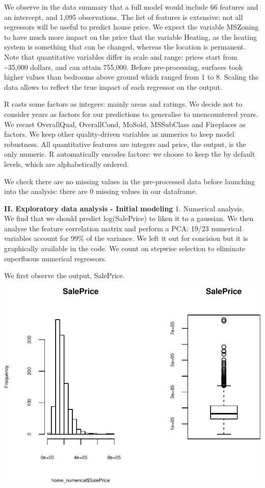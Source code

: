 \documentclass[]{article}
\begin{document}
We observe in the data summary that a full model would include 66
features and an intercept, and 1,095 observations. The list of features
is extensive: not all regressors will be useful to predict house price.
We expect the variable MSZoning to have much more impact on the price
that the variable Heating, as the heating system is something that can
be changed, whereas the location is permanent. Note that quantitative
variables differ in scale and range: prices start from
\textasciitilde{}35,000 dollars, and can attain 755,000. Before
pre-processing, surfaces took higher values than bedrooms above ground
which ranged from 1 to 8. Scaling the data allows to reflect the true
impact of each regressor on the output.

R casts some factors as integers: mainly areas and ratings. We decide
not to consider years as factors for our predictions to generalise to
unencountered years. We recast OverallQual, OverallCond, MoSold,
MSSubClass and Fireplaces as factors. We keep other quality-driven
variables as numerics to keep model robustness. All quantitative
features are integers and price, the output, is the only numeric. R
automatically encodes factors: we choose to keep the by default levels,
which are alphabetically ordered.

We check there are no missing values in the pre-processed data before
launching into the analysis: there are 0 missing values in our
dataframe.

\textbf{II. Exploratory data analysis - Initial modeling} 1. Numerical
analysis.\\
We find that we should predict log(SalePrice) to liken it to a gaussian.
We then analyse the feature correlation matrix and perform a PCA: 19/23
numerical variables account for 99\% of the variance. We left it out for
concision but it is graphically available in the code. We count on
stepwise selection to eliminate superfluous numerical regressors.

We first observe the output, SalePrice.

\begin{center}\includegraphics{r_file_v5_files/figure-latex/unnamed-chunk-7-1} \end{center}
\end{document}
